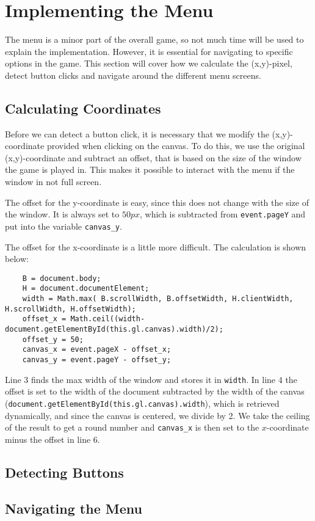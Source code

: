 \section{Implementing the Menu}
\label{sec:imp_menu}

The menu is a minor part of the overall game, so not much time will be used to explain the implementation. However, it is essential for navigating to specific options in the game. This section will cover how we calculate the (x,y)-pixel, detect button clicks and navigate around the different menu screens.

\subsection{Calculating Coordinates}

Before we can detect a button click, it is necessary that we modify the (x,y)-coordinate provided when clicking on the canvas. To do this, we use the original (x,y)-coordinate and subtract an offset, that is based on the size of the window the game is played in. This makes it possible to interact with the menu if the window in not full screen.

The offset for the y-coordinate is easy, since this does not change with the size of the window. It is always set to $50px$, which is subtracted from \verb|event.pageY| and put into the variable \verb|canvas_y|.\newline

The offset for the x-coordinate is a little more difficult. The calculation is shown below:

\begin{verbatim}
	B = document.body;
	H = document.documentElement;
	width = Math.max( B.scrollWidth, B.offsetWidth, H.clientWidth, H.scrollWidth, H.offsetWidth);
	offset_x = Math.ceil((width-document.getElementById(this.gl.canvas).width)/2);
	offset_y = 50;
	canvas_x = event.pageX - offset_x;
	canvas_y = event.pageY - offset_y;
\end{verbatim}
 
Line $3$ finds the max width of the window and stores it in \verb|width|. In line $4$ the offset is set to the width of the document subtracted by the width of the canvas (\verb|document.getElementById(this.gl.canvas).width|), which is retrieved dynamically, and since the canvas is centered, we divide by 2. We take the ceiling of the result to get a round number and \verb|canvas_x| is then set to the $x$-coordinate minus the offset in line 6.

\subsection{Detecting Buttons}



\subsection{Navigating the Menu}

